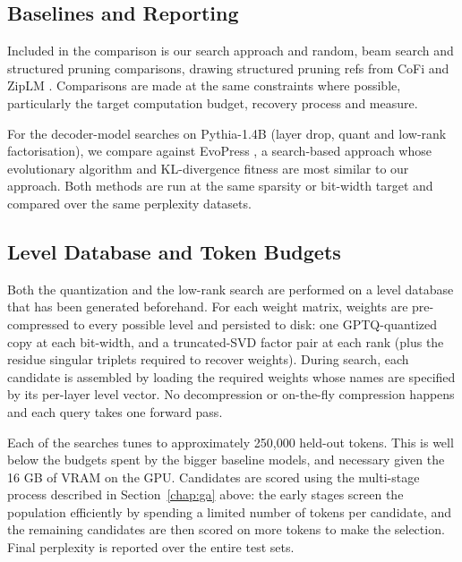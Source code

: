 \subsection{Baselines and Reporting}

Included in the comparison is our search approach and random, beam search and structured pruning comparisons, drawing structured pruning refs from CoFi \citep{xia2022cofi} and ZipLM \citep{kurtic2023ziplm}. Comparisons are made at the same constraints where possible, particularly the target computation budget, recovery process and measure.

For the decoder-model searches on Pythia-1.4B (layer drop, quant and low-rank factorisation), we compare against EvoPress \citep{evopress2024}, a search-based approach whose evolutionary algorithm and KL-divergence fitness are most similar to our approach. Both methods are run at the same sparsity or bit-width target and compared over the same perplexity datasets.

\subsection{Level Database and Token Budgets}

Both the quantization and the low-rank search are performed on a level database that has been generated beforehand. For each weight matrix, weights are pre-compressed to every possible level and persisted to disk: one GPTQ-quantized copy at each bit-width, and a truncated-SVD factor pair at each rank (plus the residue singular triplets required to recover weights). During search, each candidate is assembled by loading the required weights whose names are specified by its per-layer level vector. No decompression or on-the-fly compression happens and each query takes one forward pass.

Each of the searches tunes to approximately 250,000 held-out tokens. This is well below the budgets spent by the bigger baseline models, and necessary given the 16 GB of VRAM on the GPU. Candidates are scored using the multi-stage process described in Section~\ref{chap:ga} above: the early stages screen the population efficiently by spending a limited number of tokens per candidate, and the remaining candidates are then scored on more tokens to make the selection. Final perplexity is reported over the entire test sets.